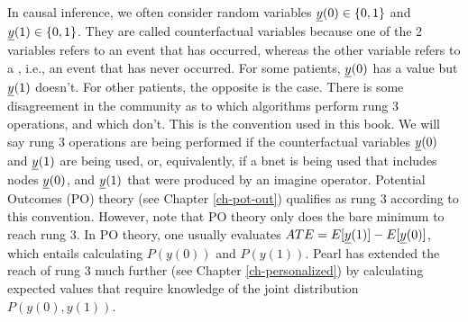 In causal inference,
we often
consider  
random variables $\rvy(0)\in \bool$
and $\rvy(1)\in\bool$. They are called
counterfactual variables because
one of the 2 variables 
refers to an event that has occurred,
whereas the other variable
refers to a ,
i.e., an event that has never 
occurred. For some patients,
$\rvy(0)$ has a value
but $\rvy(1)$
doesn't.
For other 
patients,
the opposite 
is the case.
There is some
disagreement in the
community
as to which algorithms
perform rung 3 operations,
and which don't.
This is the convention
used in this book.
We will
say rung 3 operations
are being performed 
if
the counterfactual variables $\rvy(0)$
and $\rvy(1)$
are being used,
or, equivalently,
if a bnet
is being used that
includes nodes $\rvy(0)$, and $\rvy(1)$
that were produced by an imagine operator.
Potential Outcomes (PO)
theory (see Chapter \ref{ch-pot-out})
qualifies as rung 3 according
to this convention.
However, note that PO theory 
only does the bare minimum 
to reach rung 3.
In PO theory, one usually
evaluates $ATE=E[\rvy(1)]-E[\rvy(0)]$,
which entails
calculating $P(y(0))$
and $P(y(1))$.
Pearl has extended the reach of rung 3
much further (see Chapter \ref{ch-personalized})
by calculating expected
values that require knowledge of
the joint distribution $P(y(0), y(1))$.

